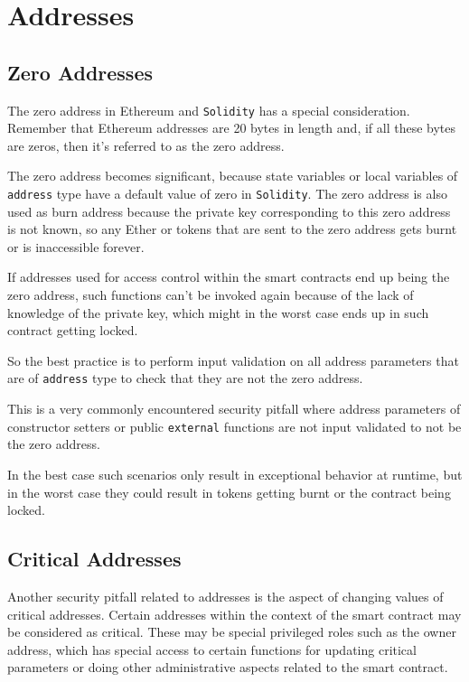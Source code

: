 \section{Addresses}\label{addresses}

\subsection{Zero Addresses}\label{zero-addresses}

The zero address in Ethereum and \texttt{Solidity} has a special
consideration. Remember that Ethereum addresses are 20 bytes in length
and, if all these bytes are zeros, then it's referred to as the zero
address.

The zero address becomes significant, because state variables or local
variables of \texttt{address} type have a default value of zero in
\texttt{Solidity}. The zero address is also used as burn address because
the private key corresponding to this zero address is not known, so any
Ether or tokens that are sent to the zero address gets burnt or is
inaccessible forever.

If addresses used for access control within the smart contracts end up
being the zero address, such functions can't be invoked again because of
the lack of knowledge of the private key, which might in the worst case
ends up in such contract getting locked.

So the best practice is to perform input validation on all address
parameters that are of \texttt{address} type to check that they are not
the zero address.

This is a very commonly encountered security pitfall where address
parameters of constructor setters or public \texttt{external} functions
are not input validated to not be the zero address.

In the best case such scenarios only result in exceptional behavior at
runtime, but in the worst case they could result in tokens getting burnt
or the contract being locked.

\subsection{Critical Addresses}\label{critical-addresses}

Another security pitfall related to addresses is the aspect of changing
values of critical addresses. Certain addresses within the context of
the smart contract may be considered as critical. These may be special
privileged roles such as the owner address, which has special access to
certain functions for updating critical parameters or doing other
administrative aspects related to the smart contract.

